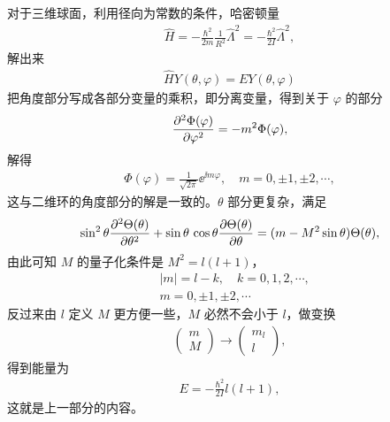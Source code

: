 对于三维球面，利用径向为常数的条件，哈密顿量
\begin{align}
    \hat H = -\frac{\hbar^2}{2m} \frac1{R^2} \hat \Lambda^2 = - \frac{\hbar^2}{2I} \hat \Lambda^2,
\end{align}
解出来
\begin{align}
    \hat H Y(\theta, \varphi) = E Y(\theta, \varphi)
\end{align}
把角度部分写成各部分变量的乘积，即分离变量，得到关于 $\varphi$ 的部分
\begin{align}
    \pdv[2]{\Phi(\varphi)}{\varphi} = - m^2 \Phi(\varphi), 
\end{align}
解得
\begin{align}
    \Phi(\varphi) = \frac1{\sqrt{2\pi}} \ee^{\ii m \varphi}, \quad m = 0,\pm1, \pm2, \cdots,
\end{align}
这与二维环的角度部分的解是一致的。$\theta$ 部分更复杂，满足
\begin{align}
    \sin^2\theta \pdv[2]{\Theta(\theta)}{\theta} + \sin\theta\, \cos\theta \pdv{\Theta(\theta)}{\theta} = (m-M^2 \sin\theta) \Theta(\theta),
\end{align}
由此可知 $M$ 的量子化条件是 $M^2 = l(l+1)$，
\begin{align}
    &|m| = l - k, \quad k = 0,1,2,\cdots,
    \\
    &m = 0, \pm1, \pm2, \cdots
\end{align}
反过来由 $l$ 定义 $M$ 更方便一些，$M$ 必然不会小于 $l$，做变换
\begin{align}
    \begin{pmatrix}
        m \\ M
    \end{pmatrix}
    \rightarrow
    \begin{pmatrix}
        m_l \\ l
    \end{pmatrix},
\end{align}
得到能量为
\begin{align}
    E = - \frac{\hbar^2}{2I} l(l+1),
\end{align}
这就是上一部分的内容。

